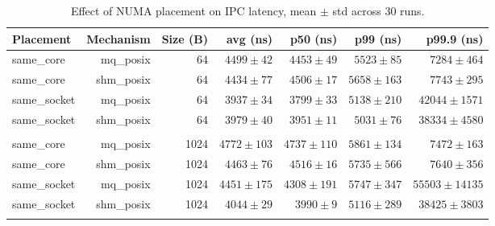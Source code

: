 \begin{table}[!t]
\centering
\caption{Effect of NUMA placement on IPC latency, mean $\pm$ std across 30 runs.}
\label{tab:numa_placement}
\begin{tabular}{lrrrrrr}
\toprule
\textbf{Placement} & \textbf{Mechanism} & \textbf{Size (B)} & \textbf{avg (ns)} & \textbf{p50 (ns)} & \textbf{p99 (ns)} & \textbf{p99.9 (ns)} \\
\midrule
same_core & mq_posix & 64 & $4499 \pm 42$ & $4453 \pm 49$ & $5523 \pm 85$ & $7284 \pm 464$ \\
same_core & shm_posix & 64 & $4434 \pm 77$ & $4506 \pm 17$ & $5658 \pm 163$ & $7743 \pm 295$ \\
same_socket & mq_posix & 64 & $3937 \pm 34$ & $3799 \pm 33$ & $5138 \pm 210$ & $42044 \pm 1571$ \\
same_socket & shm_posix & 64 & $3979 \pm 40$ & $3951 \pm 11$ & $5031 \pm 76$ & $38334 \pm 4580$ \\
 &  &  &  &  &  &  \\
same_core & mq_posix & 1024 & $4772 \pm 103$ & $4737 \pm 110$ & $5861 \pm 134$ & $7472 \pm 163$ \\
same_core & shm_posix & 1024 & $4463 \pm 76$ & $4516 \pm 16$ & $5735 \pm 566$ & $7640 \pm 356$ \\
same_socket & mq_posix & 1024 & $4451 \pm 175$ & $4308 \pm 191$ & $5747 \pm 347$ & $55503 \pm 14135$ \\
same_socket & shm_posix & 1024 & $4044 \pm 29$ & $3990 \pm 9$ & $5116 \pm 289$ & $38425 \pm 3803$ \\
 &  &  &  &  &  &  \\
\bottomrule
\end{tabular}
\end{table}
